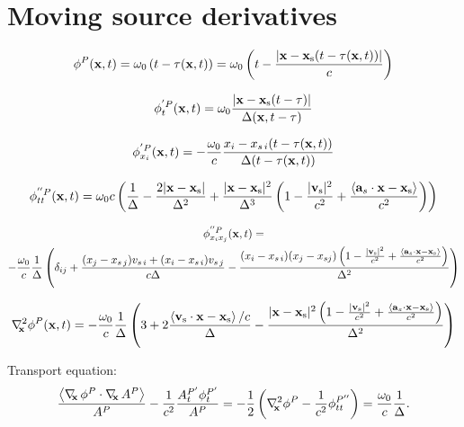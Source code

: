\section{Moving source derivatives}

\begin{equation}
\phi^{P}(\mathbf{x},t) = \omega_0 \left( t - \tau(\mathbf{x},t) \right) =  \omega_0 \left( t - \frac{|\mathbf{x}-\mathbf{x}_{\mathrm{s}}( t- \tau(\mathbf{x},t))|}{c} \right)
\end{equation}

\begin{equation}
\phi^{'P}_t(\mathbf{x},t) = \omega_0 \frac{|\mathbf{x}-\mathbf{x}_{\mathrm{s}}(t-\tau)|}{\Delta(\mathbf{x},t-\tau)}
\end{equation}

\begin{equation}
\phi^{'P}_{x_i}(\mathbf{x},t) = -\frac{\omega_0}{c} \frac{x_i -x_{s\, i}(t-\tau(\mathbf{x},t))}{\Delta(t-\tau(\mathbf{x},t))}
\end{equation}

\begin{equation}
\phi^{''P}_{tt}(\mathbf{x},t) = \omega_0 c \left( \frac{1}{\Delta} - \frac{2 |\mathbf{x}-\mathbf{x}_{\mathrm{s}}|}{\Delta^2} + \frac{|\mathbf{x}-\mathbf{x}_{\mathrm{s}}|^2}{\Delta^3}
\left( 1- \frac{|\mathbf{v}_{\mathrm{s}}|^2}{c^2} + \frac{\left< \mathbf{a}_s \cdot \mathbf{x}-\mathbf{x}_{\mathrm{s}} \right>}{c^2}\right)\right)
\end{equation}


\begin{multline} 
\small
\phi^{''P}_{x_i x_j}(\mathbf{x},t) = \\
-\frac{\omega_0}{c}\frac{ 1 }{\Delta} \left( \delta_{ij} +  \frac{  (x_j -x_{s\, j})v_{s\, i} + (x_i -x_{s\, i}) v_{s \, j} }{c \Delta} 
-  \frac{(x_i -x_{s\, i}) (x_j -x_{s j}) \left( 1-  \frac{|\mathbf{v}_{\mathrm{s}}|^2}{c^2} + \frac{\left< \mathbf{a}_s\cdot \mathbf{x} - \mathbf{x}_{\mathrm{s}}\right>}{c^2} \right)  }{\Delta^2} \right)
\end{multline}


\begin{equation} 
\small
\nabla^2_{\!\!\mathbf{x}} \phi^P(\mathbf{x},t) = 
-\frac{\omega_0}{c}\frac{ 1 }{\Delta} \left( 3 +  2 \frac{  \left< \mathbf{v}_{\mathrm{s}} \cdot \mathbf{x} - \mathbf{x}_{\mathrm{s}}  \right> /c}{ \Delta} 
-  \frac{|\mathbf{x}-\mathbf{x}_{\mathrm{s}}|^2 \left( 1-  \frac{|\mathbf{v}_{\mathrm{s}}|^2}{c^2} + \frac{\left< \mathbf{a}_s\cdot \mathbf{x} - \mathbf{x}_{\mathrm{s}}\right>}{c^2} \right)  }{\Delta^2} \right)
\end{equation}

Transport equation:
\begin{equation}
\frac{ \left< \nabla_{\!\!\mathbf{x}}\, \phi^P \cdot \nabla_{\!\!\mathbf{x}}\, A^P \right> }{A^P} - \frac{1}{c^2} \frac{A^{P'}_t \phi^{P'}_t }{A^P} = -\frac{1}{2} \left( \nabla^2_{\!\!\mathbf{x}} \phi^P - \frac{1}{c^2} \phi^{P''}_{tt} \right) = \frac{\omega_0}{c} \frac{1}{\Delta}.
\end{equation}

